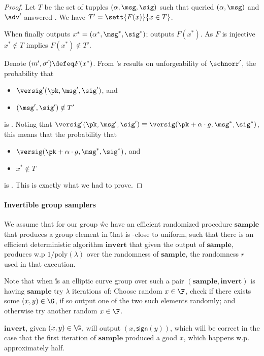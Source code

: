 \documentclass[11pt]{article}
\numberwithin{equation}{section} %
\numberwithin{figure}{section} %
\newcommand{\set}[1]{\ensuremath{\left\{#1\right\}}\xspace}
\newcommand{\poly}{\ensuremath{\mathrm{poly}(\lambda)}\xspace}
\begin{document}
\begin{proof}
Let $T$ be the set of tupples $(\alpha,\msg,\sig)$ such that \adv queried $(\alpha,\msg)$ and $\adv'$ answered \sig.
We have $T'= \sett{F(x)}{x\in T}$.

When \adv finally outputs $x^*=(\alpha^*,\msg^*,\sig^*)$;
\advprime outputs $F(x^*)$. 
As $F$ is injective $x^* \notin T$
implies $F(x^*)\notin T'$.

Denote $(m',\sigma')\defeq F(x^*)$.
From \cite{schnorrSecurity}'s results on unforgeability of $\schnorr'$, the probability that 
\begin{itemize}
   \item $\versig'(\pk,\msg',\sig')$, and 
   \item $(\msg',\sig')\notin T'$
\end{itemize}
is \negl.
Noting that $\versig'(\pk,\msg',\sig')\equiv \versig(\pk+\alpha\cdot g, \msg^*,\sig^*)$,
this means that the probability that
\begin{itemize}
   \item $\versig(\pk+\alpha\cdot g,\msg^*,\sig^*)$, and 
   \item $x^* \notin T$
\end{itemize}
is \negl.
This is exactly what we had to prove.
\end{proof}
\newcommand{\sample}{\ensuremath{\mathbf{sample}}\xspace}
\newcommand{\invert}{\ensuremath{\mathbf{invert}}\xspace}
\newcommand{\bigset}[2]{\ensuremath{W|_{#1\setminus #2}}\xspace}
\newcommand{\goodset}[2]{\ensuremath{W_{#1,#2}}\xspace}

\paragraph{Invertible group samplers}
We assume that for our group \G we have an efficient randomized procedure \sample that produces a group element in \G that is \negl-close to uniform,
such that there is an efficient deterministic algorithm \invert that given the output of \sample, produces w.p $1/\poly$
over the randomness of \sample, the randomness $r$ used in that execution. 

Note that when \G is an elliptic curve group over \F such a pair $(\sample,\invert)$
is having \sample try $\lambda$ iterations of: Choose random $x\in \F$, check if there exists some $(x,y)\in \G$, if so output one of the two such elements randomly; and otherwise try another random $x\in\F$.

\invert, given $(x,y)\in \G$, will output $(x,\mathsf{sign}(y))$, which will be correct in the case that the first iteration of \sample produced a good $x$, which happens w.p. approximately half.
\end{document}
